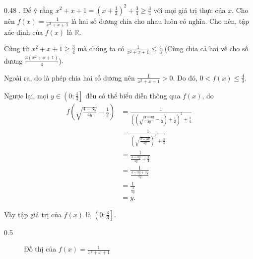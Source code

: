 {
   \begin{minipageindent}{0.48\textwidth}
      . Để ý rằng $x^2 + x + 1 = \left(x + \frac{1}{2}\right)^2 + \frac{3}{4} \geq \frac{3}{4}$ với mọi giá trị thực của $x$. Cho nên $f(x) = \frac{1}{x^2 + x + 1}$ là hai số dương chia cho nhau luôn có nghĩa. Cho nên, tập xác định của $f(x)$ là $\mathbb{R}$.

      Cũng từ $x^2 + x + 1 \geq \frac{3}{4}$ mà chúng ta có $\frac{1}{x^2 + x + 1} \leq \frac{4}{3}$ \textcolor{colorEmphasis}{(Cùng chia cả hai vế cho số dương $\frac{3(x^2 + x + 1)}{4}$)}.
      
      Ngoài ra, do là phép chia hai số dương nên $\frac{1}{x^2 + x + 1} > 0$. Do đó, $0 < f(x) \leq \frac{4}{3}$.

      Ngược lại, mọi $y \in \left(0; \frac{4}{3}\right]$ đều có thể biểu diễn thông qua $f(x)$, do 
      \begin{align*}
         f\left(\sqrt{\frac{4-3y}{4y}} - \frac{1}{2} \right) &= \frac{1}{\left(\left(\sqrt{\frac{4-3y}{4y}} - \frac{1}{2}\right) + \frac{1}{2}\right)^2 + \frac{3}{4}} \\
         &= \frac{1}{\left(\sqrt{\frac{4-3y}{4y}}\right)^2 + \frac{3}{4}} \\
         &= \frac{1}{\frac{4-3y}{4y} + \frac{3}{4}} \\
         &= \frac{1}{\frac{4-3y + 3y}{4y}} \\
         &= \frac{1}{\frac{4}{4y}} \\
         &= y.
      \end{align*}

      Vậy tập giá trị của $f(x)$ là $\left(0; \frac{4}{3}\right]$.
   \end{minipageindent}
   \hfill
   \begin{minipageindent}{0.5\textwidth}
      \begin{figure}[H]
         \centering
         \caption{Đồ thị của $f(x) = \frac{1}{x^{2} + x + 1}$}
         \label{fig:ham_so_mot_bien:phan_thuc:1_x2_1x_1}
      \end{figure}
   \end{minipageindent}
}

